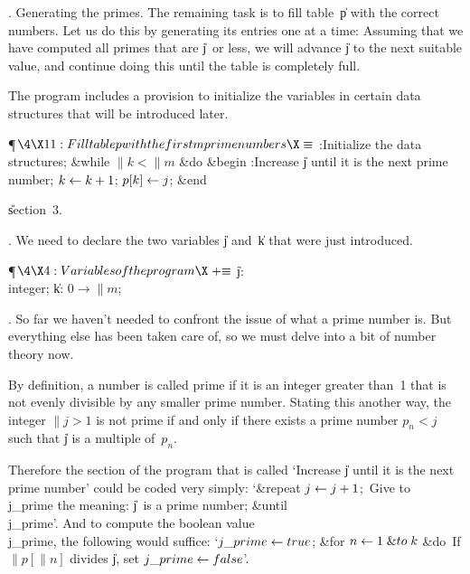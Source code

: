.  Generating the primes.
The remaining task is to fill table~\|p with the correct numbers.
Let us do this by generating its entries one at a time: Assuming that
we have computed all primes that are \|j~or less, we will advance \|j
to the next suitable value, and continue doing this until the
table is completely full.

The program includes a provision to initialize the variables in certain
data structures that will be introduced later.

\Y\P$\4\X11:Fill table \|p with the first \|m prime numbers\X\S$\6
:Initialize the data structures\X;\6
\&{while} $\|k<\|m$ \1\&{do}\6
\&{begin} :Increase \|j until it is the next prime number\X;\6
$\hbox{$k$}\gets\hbox{$k$}+1$;\5
$\hbox{$p$}[\hbox{$k$}]\gets\hbox{$j$}$;\6
\&{end}\2\par
\U section~3.\fi

. We need to declare the two variables \|j and~\|k that were just
introduced.

\Y\P$\4\X4:Variables of the program\X\mathrel{+}\S$\6
\4\|j: \\{integer};\6
\4\|k: $0\to\|m$;\par
\fi

. So far we haven't needed to confront the issue of what a prime number
is. But everything else has been taken care of, so we must delve into
a bit of number theory now.

By definition, a number is called prime if it is an integer greater
than~1 that is not evenly divisible by any smaller prime number. Stating
this another way, the integer $\|j>1$ is not prime if and only if there
exists a prime number $p_n<j$ such that \|j is a multiple of~$p_n$.

Therefore the section of the program that is called `\<Increase \|j until
it is the next prime number\>' could be coded very simply:
`\ignorespaces \&{repeat} $\hbox{$j$}\gets\hbox{$j$}+1$;\unskip\
\<Give to~\\{j\_prime} the meaning: \|j~is a prime number\>;
\ignorespaces  \&{until}  \\{j\_prime}\unskip'.
And to compute the boolean value \\{j\_prime}, the following
would suffice: `\ignorespaces$\\{j\_prime}\gets\\{true}$;  \&{for} $\|n\K1%
\mathrel{\&{to}}\|k$ \&{do}\unskip\
\<If $\|p[\|n]$ divides \|j, set $\\{j\_prime}\gets\\{false}$\>'.


